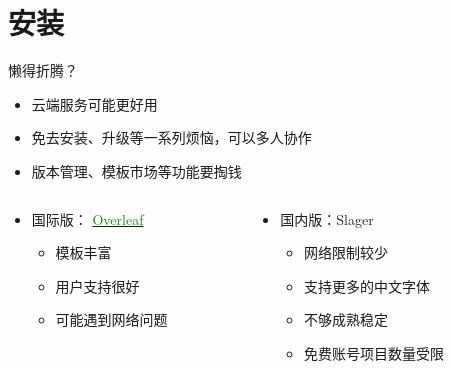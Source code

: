 \section{安装}

\begin{frame}{懒得折腾？}
    \begin{itemize}
    \item 云端服务可能更好用
    \item 免去安装、升级等一系列烦恼，可以多人协作
    \item 版本管理、模板市场等功能要掏钱
    \end{itemize}\pause

    \begin{columns}[t]
    \begin{column}{0.48\textwidth}
        \begin{itemize}\small
        \item 国际版：
            \href{https://www.overleaf.com}{\textcolor[HTML]{138a07}{Overleaf} \faLink}

            \begin{itemize}
            \item 模板丰富
            \item 用户支持很好
            \item 可能遇到网络问题
            \end{itemize}
        \end{itemize}
    \end{column}
    \begin{column}{0.48\textwidth}
        \begin{itemize}\small
        \item 国内版：Slager 

        \begin{itemize}
            \item 网络限制较少
            \item 支持更多的中文字体
            \item 不够成熟稳定
            \item 免费账号项目数量受限
        \end{itemize}
        \end{itemize}

    \end{column}
    \end{columns}
\end{frame}

